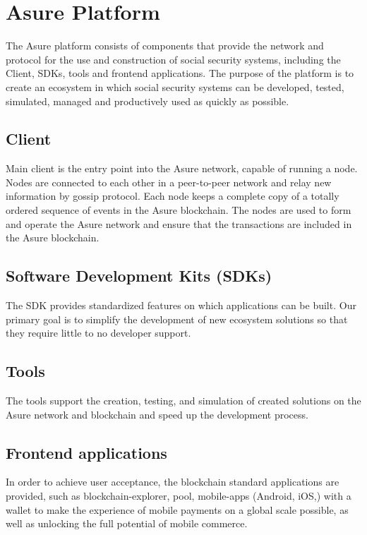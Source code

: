 \section{Asure Platform}

The Asure platform consists of components that provide the network and protocol for the use and construction of social security systems, including the Client, SDKs, tools and frontend applications. The purpose of the platform is to create an ecosystem in which social security systems can be developed, tested, simulated, managed and productively used as quickly as possible.

\subsection{Client}
Main client is the entry point into the Asure network, capable of running a node. Nodes are connected to each other in a peer-to-peer network and relay new information by gossip protocol. Each node keeps a complete copy of a totally ordered sequence of events in the Asure blockchain. The nodes are used to form and operate the Asure network and ensure that the transactions are included in the Asure blockchain.

\subsection{Software Development Kits (SDKs) }
The SDK provides standardized features on which applications can be built. Our primary goal is to simplify the development of new ecosystem solutions so that they require little to no developer support.

\subsection{Tools}
The tools support the creation, testing, and simulation of created solutions on the Asure network and blockchain and speed up the development process.

\subsection{Frontend applications}
In order to achieve user acceptance, the blockchain standard applications are provided, such as blockchain-explorer, pool, mobile-apps (Android, iOS,) with a wallet to make the experience of mobile payments on a  global scale possible, as well as unlocking the full potential of mobile commerce.
